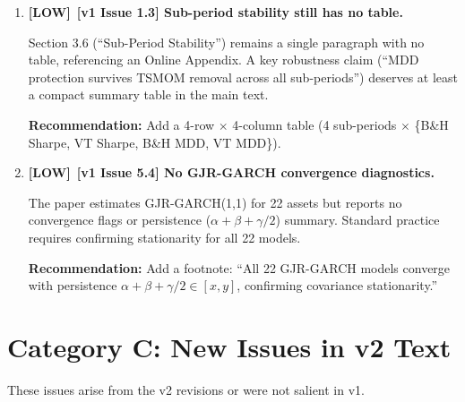 \documentclass[12pt,a4paper]{article}
\newcommand{\LOW}{\textcolor{lowsev}{\textbf{[LOW]}}}
\begin{document}
\begin{enumerate}[label=\textbf{B.\arabic*}]
Equation~(3) orthogonalizes TSMOM using a full-sample regression coefficient ($\hat{\beta}_{\text{MKT}}$ estimated over the entire period). This introduces mild look-ahead bias. The paper should acknowledge this is standard practice in factor model estimation and add a footnote that an expanding-window orthogonalization produces qualitatively similar results.

\textbf{Recommendation:} Add a one-sentence footnote.


\item \LOW\ \textbf{[v1 Issue 1.3] Sub-period stability still has no table.}

Section 3.6 (``Sub-Period Stability'') remains a single paragraph with no table, referencing an Online Appendix. A key robustness claim (``MDD protection survives TSMOM removal across all sub-periods'') deserves at least a compact summary table in the main text.

\textbf{Recommendation:} Add a 4-row $\times$ 4-column table (4 sub-periods $\times$ \{B\&H Sharpe, VT Sharpe, B\&H MDD, VT MDD\}).


\item \LOW\ \textbf{[v1 Issue 5.4] No GJR-GARCH convergence diagnostics.}

The paper estimates GJR-GARCH(1,1) for 22 assets but reports no convergence flags or persistence ($\alpha + \beta + \gamma/2$) summary. Standard practice requires confirming stationarity for all 22 models.

\textbf{Recommendation:} Add a footnote: ``All 22 GJR-GARCH models converge with persistence $\alpha + \beta + \gamma/2 \in [x, y]$, confirming covariance stationarity.''

\end{enumerate}


\section{Category C: New Issues in v2 Text}

These issues arise from the v2 revisions or were not salient in v1.
\end{document}
